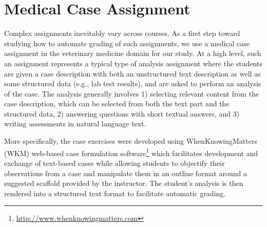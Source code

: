 \section{Medical Case Assignment}

Complex assignments inevitably vary across courses. As a first step toward
studying how to automate grading of such assignments, we  use a medical
case assignment in the veterinary medicine domain for our study. At a high
level, such an assignment represents a typical type of analysis assignment
where the students are given a case description with both an unstructured
text description as well as some structured data (e.g., lab test results),
and are asked to perform an analysis of the case. The analysis generally
involves 1) selecting relevant content from the case description, which can
be selected from both the text part and the structured data, 2) answering
questions with short textual answers, and 3) writing assessments in
natural language text.

More specifically, the case exercises were developed using
WhenKnowingMatters (WKM) web-based case formulation
software\footnote{\url{http://www.whenknowingmatters.com}} which
facilitates development and exchange of text-based cases while allowing
students to objectify their observations from a case and manipulate them in
an outline format around a suggested scaffold provided by the instructor.
The student's analysis is then rendered into a structured text format to
facilitate automatic grading.

